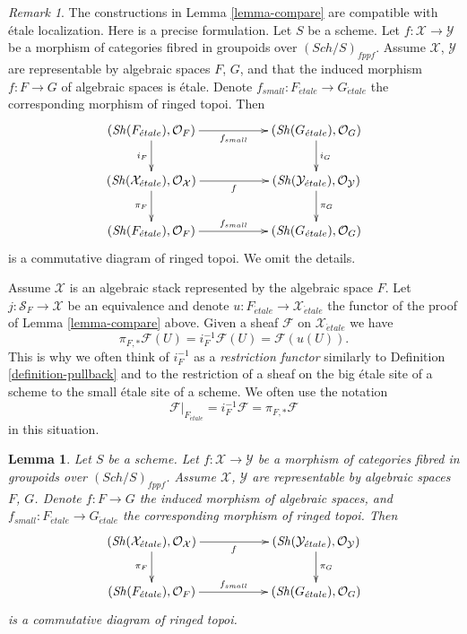 \documentclass{stacks-project}
\theoremstyle{plain}
\newtheorem{lemma}[subsection]{Lemma}
\theoremstyle{definition}
\theoremstyle{remark}
\newtheorem{remark}[subsection]{Remark}
\numberwithin{equation}{subsection}
\def\Sch{\mathit{Sch}}
\def\Sh{\mathop{\mathit{Sh}}\nolimits}
\def\etale{{\acute{e}tale}}
\begin{document}
\begin{remark}
\label{remark-compare}
The constructions in Lemma \ref{lemma-compare} are compatible with \'etale
localization. Here is a precise formulation. Let $S$ be a scheme.
Let $f : \mathcal{X} \to \mathcal{Y}$ be a morphism
of categories fibred in groupoids over $(\Sch/S)_{fppf}$. Assume
$\mathcal{X}$, $\mathcal{Y}$ are representable by algebraic spaces $F$, $G$,
and that the induced morphism $f : F \to G$ of algebraic spaces is \'etale.
Denote $f_{small} : F_\etale \to G_\etale$
the corresponding morphism of ringed topoi. Then
$$
\xymatrix{
(\Sh(F_\etale), \mathcal{O}_F) \ar[rr]_{f_{small}} \ar[d]_{i_F} & &
(\Sh(G_\etale), \mathcal{O}_G) \ar[d]^{i_G} \\
(\Sh(\mathcal{X}_\etale), \mathcal{O}_\mathcal{X})
\ar[d]_{\pi_F} \ar[rr]_f & &
(\Sh(\mathcal{Y}_\etale), \mathcal{O}_\mathcal{Y}) \ar[d]^{\pi_G} \\
(\Sh(F_\etale), \mathcal{O}_F) \ar[rr]^{f_{small}} & &
(\Sh(G_\etale), \mathcal{O}_G)
}
$$
is a commutative diagram of ringed topoi. We omit the details.
\end{remark}

\noindent
Assume $\mathcal{X}$ is an algebraic stack represented by the
algebraic space $F$.
Let $j : \mathcal{S}_F \to \mathcal{X}$ be an equivalence and denote
$u : F_\etale \to \mathcal{X}_\etale$ the
functor of the proof of Lemma \ref{lemma-compare} above.
Given a sheaf $\mathcal{F}$ on $\mathcal{X}_\etale$ we have
$$
\pi_{F, *}\mathcal{F}(U) = i_F^{-1}\mathcal{F}(U) = \mathcal{F}(u(U)).
$$
This is why we often think of $i_F^{-1}$ as a {\it restriction functor}
similarly to
Definition \ref{definition-pullback}
and to the restriction of a sheaf on the big \'etale site of
a scheme to the small \'etale site of a scheme. We often use the notation
\begin{equation}
\label{equation-restrict}
\mathcal{F}|_{F_\etale} = i_F^{-1}\mathcal{F} = \pi_{F, *}\mathcal{F}
\end{equation}
in this situation.

\begin{lemma}
\label{lemma-compare-morphism}
Let $S$ be a scheme. Let $f : \mathcal{X} \to \mathcal{Y}$ be a morphism
of categories fibred in groupoids over $(\Sch/S)_{fppf}$. Assume
$\mathcal{X}$, $\mathcal{Y}$ are representable by algebraic spaces $F$, $G$.
Denote $f : F \to G$ the induced morphism of algebraic spaces, and
$f_{small} : F_\etale \to G_\etale$
the corresponding morphism of ringed topoi. Then
$$
\xymatrix{
(\Sh(\mathcal{X}_\etale), \mathcal{O}_\mathcal{X})
\ar[d]_{\pi_F} \ar[rr]_f & &
(\Sh(\mathcal{Y}_\etale), \mathcal{O}_\mathcal{Y}) \ar[d]^{\pi_G} \\
(\Sh(F_\etale), \mathcal{O}_F) \ar[rr]^{f_{small}} & &
(\Sh(G_\etale), \mathcal{O}_G)
}
$$
is a commutative diagram of ringed topoi.
\end{lemma}
\end{document}
